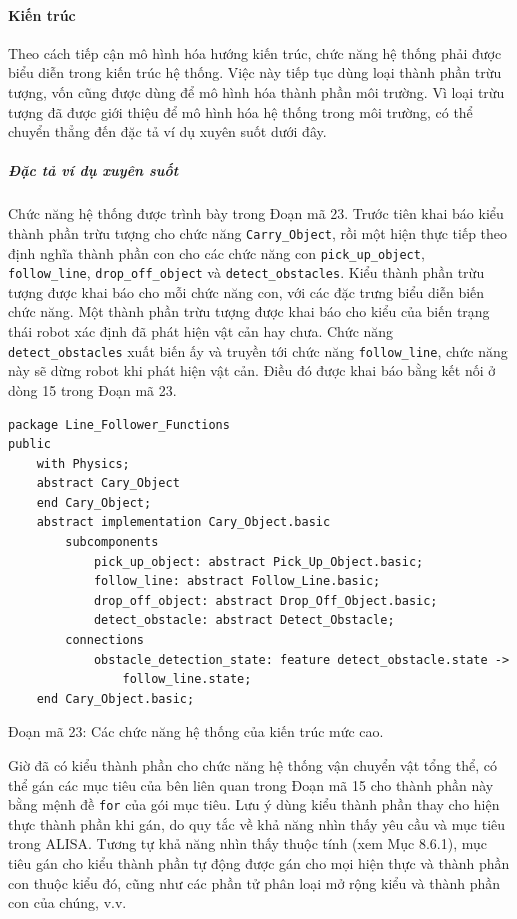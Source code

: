 \paragraph{Kiến trúc}
Theo cách tiếp cận mô hình hóa hướng kiến trúc, chức năng hệ thống phải được biểu diễn trong kiến trúc hệ thống. Việc này tiếp tục dùng loại thành phần trừu tượng, vốn cũng được dùng để mô hình hóa thành phần môi trường. Vì loại trừu tượng đã được giới thiệu để mô hình hóa hệ thống trong môi trường, có thể chuyển thẳng đến đặc tả ví dụ xuyên suốt dưới đây.

\subparagraph{Đặc tả ví dụ xuyên suốt}
Chức năng hệ thống được trình bày trong Đoạn mã 23. Trước tiên khai báo kiểu thành phần trừu tượng cho chức năng \texttt{Carry\_Object}, rồi một hiện thực tiếp theo định nghĩa thành phần con cho các chức năng con \texttt{pick\_up\_object}, \texttt{follow\_line}, \texttt{drop\_off\_object}
và \texttt{detect\_obstacles}. Kiểu thành phần trừu tượng được khai báo cho mỗi chức năng con, với các đặc trưng biểu diễn biến chức năng. Một thành phần trừu tượng được khai báo cho kiểu của biến trạng thái robot xác định đã phát hiện vật cản hay chưa. Chức năng \texttt{detect\_obstacles} xuất biến ấy và truyền tới chức năng \texttt{follow\_line}, chức năng này sẽ dừng robot khi phát hiện vật cản. Điều đó được khai báo bằng kết nối ở dòng 15 trong Đoạn mã 23.
\begin{verbatim}
package Line_Follower_Functions
public
    with Physics;
    abstract Cary_Object
    end Cary_Object;
    abstract implementation Cary_Object.basic
        subcomponents
            pick_up_object: abstract Pick_Up_Object.basic;
            follow_line: abstract Follow_Line.basic;
            drop_off_object: abstract Drop_Off_Object.basic;
            detect_obstacle: abstract Detect_Obstacle;
        connections
            obstacle_detection_state: feature detect_obstacle.state ->
                follow_line.state;
    end Cary_Object.basic;
\end{verbatim}
\begin{center}\small Đoạn mã 23: Các chức năng hệ thống của kiến trúc mức cao.\end{center}

Giờ đã có kiểu thành phần cho chức năng hệ thống vận chuyển vật tổng thể, có thể gán các mục tiêu của bên liên quan trong Đoạn mã 15 cho thành phần này bằng mệnh đề \texttt{for} của gói mục tiêu. Lưu ý dùng kiểu thành phần thay cho hiện thực thành phần khi gán, do quy tắc về khả năng nhìn thấy yêu cầu và mục tiêu trong ALISA. Tương tự khả năng nhìn thấy thuộc tính (xem Mục 8.6.1), mục tiêu gán cho kiểu thành phần tự động được gán cho mọi hiện thực và thành phần con thuộc kiểu đó, cũng như các phần tử phân loại mở rộng kiểu và thành phần con của chúng, v.v.

